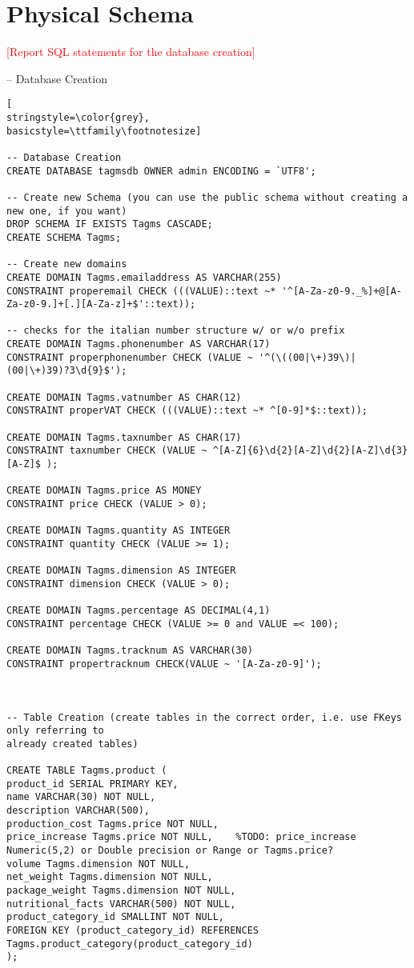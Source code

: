 \section{Physical Schema}
\textcolor{red}{[Report SQL statements for the database creation]}

-- Database Creation
\begin{lstlisting}[
stringstyle=\color{grey},
basicstyle=\ttfamily\footnotesize]

-- Database Creation
CREATE DATABASE tagmsdb OWNER admin ENCODING = `UTF8';

-- Create new Schema (you can use the public schema without creating a new one, if you want)
DROP SCHEMA IF EXISTS Tagms CASCADE;
CREATE SCHEMA Tagms;

-- Create new domains
CREATE DOMAIN Tagms.emailaddress AS VARCHAR(255)
CONSTRAINT properemail CHECK (((VALUE)::text ~* '^[A-Za-z0-9._%]+@[A-Za-z0-9.]+[.][A-Za-z]+$'::text));

-- checks for the italian number structure w/ or w/o prefix
CREATE DOMAIN Tagms.phonenumber AS VARCHAR(17)
CONSTRAINT properphonenumber CHECK (VALUE ~ '^(\((00|\+)39\)|(00|\+)39)?3\d{9}$');

CREATE DOMAIN Tagms.vatnumber AS CHAR(12)
CONSTRAINT properVAT CHECK (((VALUE)::text ~* ^[0-9]*$::text));

CREATE DOMAIN Tagms.taxnumber AS CHAR(17)
CONSTRAINT taxnumber CHECK (VALUE ~ ^[A-Z]{6}\d{2}[A-Z]\d{2}[A-Z]\d{3}[A-Z]$ );

CREATE DOMAIN Tagms.price AS MONEY
CONSTRAINT price CHECK (VALUE > 0);

CREATE DOMAIN Tagms.quantity AS INTEGER
CONSTRAINT quantity CHECK (VALUE >= 1);

CREATE DOMAIN Tagms.dimension AS INTEGER
CONSTRAINT dimension CHECK (VALUE > 0);

CREATE DOMAIN Tagms.percentage AS DECIMAL(4,1)
CONSTRAINT percentage CHECK (VALUE >= 0 and VALUE =< 100);

CREATE DOMAIN Tagms.tracknum AS VARCHAR(30)
CONSTRAINT propertracknum CHECK(VALUE ~ '[A-Za-z0-9]');



-- Table Creation (create tables in the correct order, i.e. use FKeys only referring to
already created tables)

CREATE TABLE Tagms.product (
product_id SERIAL PRIMARY KEY,
name VARCHAR(30) NOT NULL,
description VARCHAR(500),
production_cost Tagms.price NOT NULL,
price_increase Tagms.price NOT NULL,	%TODO: price_increase Numeric(5,2) or Double precision or Range or Tagms.price?
volume Tagms.dimension NOT NULL,
net_weight Tagms.dimension NOT NULL,
package_weight Tagms.dimension NOT NULL,
nutritional_facts VARCHAR(500) NOT NULL,
product_category_id SMALLINT NOT NULL,
FOREIGN KEY (product_category_id) REFERENCES Tagms.product_category(product_category_id)
);


\end{lstlisting}
